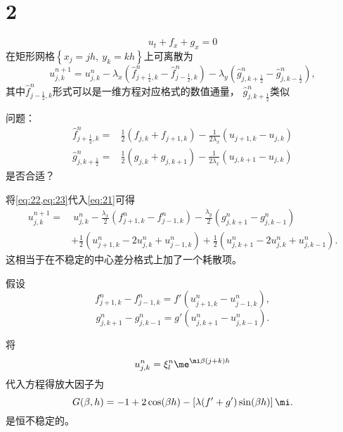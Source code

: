 \documentclass[12pt]{article}
\begin{document}
\section{2}


\begin{equation}
	u_t + f_x+g_x=0
\end{equation}
在矩形网格$\left\{x_j=jh,\ y_k=kh\right\}$上可离散为
\begin{equation}
	u^{n+1}_{j,k} = u^n_{j,k} - \lambda_x\left(\hat{f}^n_{j+\frac{1}{2},k}-\hat{f}^n_{j-\frac{1}{2},k}\right) - \lambda_y \left(\hat{g}^n_{j,k+\frac{1}{2}}-\hat{g}^n_{j,k-\frac{1}{2}}\right),
	\label{eq:21}
\end{equation}
其中$\hat{f}^n_{j-\frac{1}{2},k}$形式可以是一维方程对应格式的数值通量， $\hat{g}^n_{j,k+\frac{1}{2}}$类似

问题：
\begin{align}
	\hat{f}^n_{j+\frac{1}{2},k} = & \frac{1}{2}\left(f_{j,k} + f_{j+1,k}\right)-\frac{1}{2\lambda_x}\left(u_{j+1,k}-u_{j,k}\right)
	\label{eq:22}                                                                                                                  \\
	\hat{g}^n_{j,k+\frac{1}{2}} = & \frac{1}{2}\left(g_{j,k} + g_{j,k+1}\right)-\frac{1}{2\lambda_x}\left(u_{j,k+1}-u_{j,k}\right)
	\label{eq:23}
\end{align}
是否合适？

将\cref{eq:22,eq:23}代入\cref{eq:21}可得
\begin{equation}
	\begin{aligned}
		u^{n+1}_{j,k} = & \ u^n_{j,k} - \frac{\lambda_x}{2}\left({f}^n_{j+1,k}-{f}^n_{j-1,k}\right) -  \frac{\lambda_y}{2}\left({g}^n_{j,k+1}-{g}^n_{j,k-1}\right) \\
		                & +\frac{1}{2}\left(u^n_{j+1,k}-2u^n_{j,k}+u^n_{j-1,k}\right)+\frac{1}{2}\left(u^n_{j,k+1}-2u^n_{j,k}+u^n_{j,k-1}\right).
	\end{aligned}
	\label{eq:24}
\end{equation}
这相当于在不稳定的中心差分格式上加了一个耗散项。

假设
\begin{equation}
	{f}^n_{j+1,k}-{f}^n_{j-1,k} = f'\left(u^n_{j+1,k}-u^n_{j-1,k}\right),
\end{equation}
\begin{equation}
	{g}^n_{j,k+1}-{g}^n_{j,k-1} = g' \left(u^n_{j,k+1}-u^n_{j,k-1}\right).
\end{equation}

将
\begin{equation}
	u^n_{j,k} = \xi^n_l \me^{\mi \beta (j+k)h}
\end{equation}
代入方程得放大因子为
\begin{equation}
	G(\beta,h) = -1 + 2\cos(\beta h) -\left[\lambda(f'+g')\sin(\beta h)\right]\mi.
\end{equation}
是恒不稳定的。














% 
\end{document}
